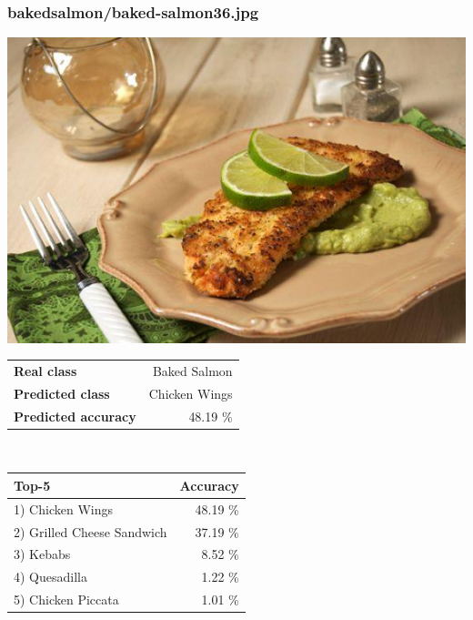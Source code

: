 \subsubsection{baked\textunderscore salmon/baked-salmon36.jpg}

\begin{minipage}[t]{0.4\textwidth}
	\vspace{0pt}
	\includegraphics[width=\linewidth]{images/evaluation-images/baked_salmon/baked-salmon36.jpg}
\end{minipage}
\hfill
\begin{minipage}[t]{0.5\textwidth}
	\vspace{0pt}\raggedright
	\begin{tabularx}{\textwidth}{X r}
		\small \textbf{Real class} & \small Baked Salmon\\
		\small \textbf{Predicted class} & \small Chicken Wings\\
		\small \textbf{Predicted accuracy} & \small 48.19 \%
    \end{tabularx}\\
    
    \vspace{6pt}
	\begin{tabularx}{\textwidth}{X r}
        \small \textbf{Top-5} & \small \textbf{Accuracy} \\
        \hline
		\small 1) Chicken Wings & \small 48.19 \%\\\small 2) Grilled Cheese Sandwich & \small 37.19 \%\\\small 3) Kebabs & \small 8.52 \%\\\small 4) Quesadilla & \small 1.22 \%\\\small 5) Chicken Piccata & \small 1.01 \%
    \end{tabularx}
\end{minipage}
    
